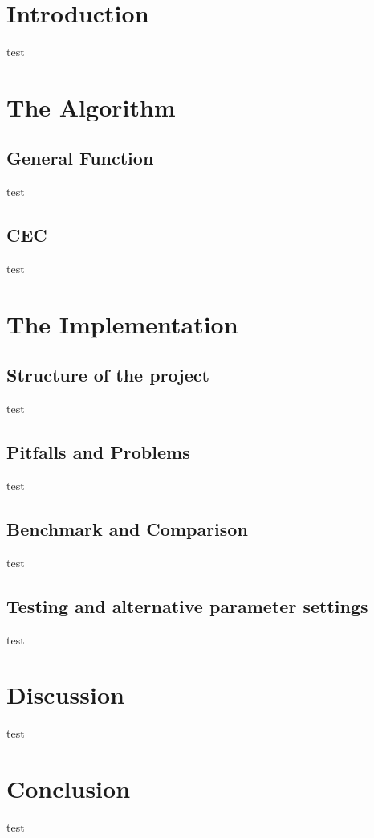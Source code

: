 \section{Introduction}
\label{introduction}

test

\pagebreak 

\section{The Algorithm}
\label{thealgorithm}

\subsection{General Function}
\label{generalfunction}

test

\subsection{CEC}
\label{cec}

test

\pagebreak 

\section{The Implementation}
\label{theimplementation}

\subsection{Structure of the project}
\label{structureoftheproject}

test

\subsection{Pitfalls and Problems}
\label{pitfallsandproblems}

test

\subsection{Benchmark and Comparison}
\label{benchmarkandcomparison}

test

\subsection{Testing and alternative parameter settings}
\label{testingandalternativeparametersettings}

test

\section{Discussion}
\label{discussion}

test

\section{Conclusion}
\label{conclusion}

test
